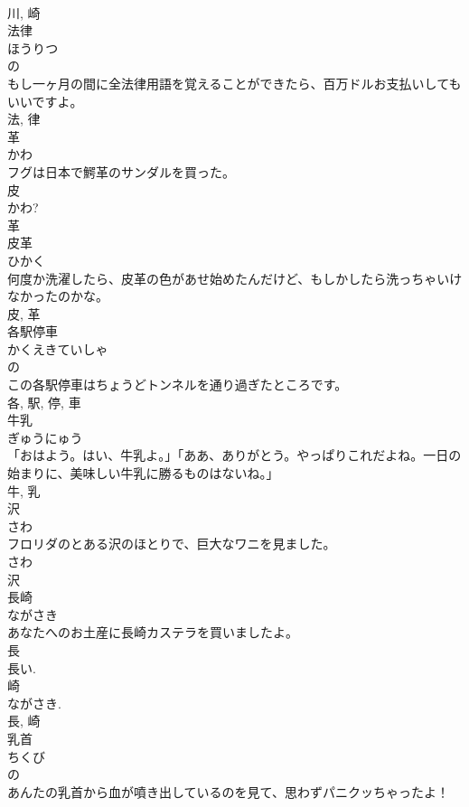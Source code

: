 \documentclass[8pt]{extreport}
\begin{document}
\begin{CJK}{UTF8}{min}
\\	川, 崎	
\\	法律	
\\	ほうりつ	
\\	の 
\\	もし一ヶ月の間に全法律用語を覚えることができたら、百万ドルお支払いしてもいいですよ。	
\\	法, 律	
\\	革	
\\	かわ	
\\	フグは日本で鰐革のサンダルを買った。	
\\	皮 
\\	かわ? 
\\	革	
\\	皮革	
\\	ひかく	
\\	何度か洗濯したら、皮革の色があせ始めたんだけど、もしかしたら洗っちゃいけなかったのかな。	
\\	皮, 革	
\\	各駅停車	
\\	かくえきていしゃ	
\\	の 
\\	この各駅停車はちょうどトンネルを通り過ぎたところです。	
\\	各, 駅, 停, 車	
\\	牛乳	
\\	ぎゅうにゅう	
\\	「おはよう。はい、牛乳よ。」「ああ、ありがとう。やっぱりこれだよね。一日の始まりに、美味しい牛乳に勝るものはないね。」	
\\	牛, 乳	
\\	沢	
\\	さわ	
\\	フロリダのとある沢のほとりで、巨大なワニを見ました。	
\\	さわ 
\\	沢	
\\	長崎	
\\	ながさき	
\\	あなたへのお土産に長崎カステラを買いましたよ。	
\\	長 
\\	長い. 
\\	崎 
\\	ながさき. 
\\	長, 崎	
\\	乳首	
\\	ちくび	
\\	の 
\\	あんたの乳首から血が噴き出しているのを見て、思わずパニクッちゃったよ！	

\end{CJK}
\end{document}
